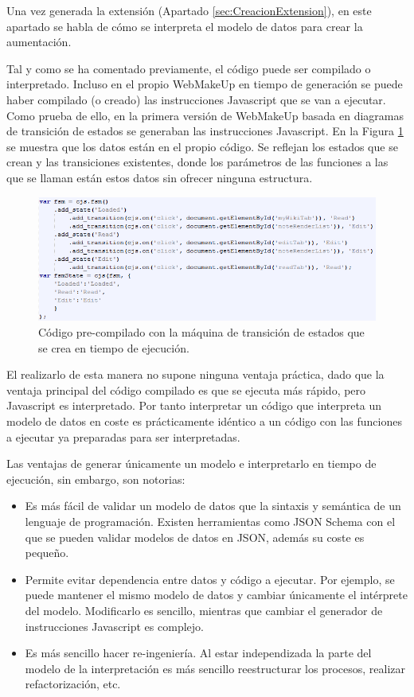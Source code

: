 Una vez generada la extensión (Apartado \ref{sec:CreacionExtension}), en este apartado se habla de cómo se interpreta el modelo de datos para crear la aumentación.

Tal y como se ha comentado previamente, el código puede ser compilado o interpretado. Incluso en el propio WebMakeUp en tiempo de generación se puede haber compilado (o creado) las instrucciones Javascript que se van a ejecutar. Como prueba de ello, en la primera versión de WebMakeUp basada en diagramas de transición de estados se generaban las instrucciones Javascript. En la Figura \ref{fig:generatedCompiledCodeSTD} se muestra que los datos están en el propio código. Se reflejan los estados que se crean y las transiciones existentes, donde los parámetros de las funciones a las que se llaman están estos datos sin ofrecer ninguna estructura.

\begin{figure}
\centering
\includegraphics[width=0.95\linewidth]{./figs/5-generatedCompiledCodeSTD}
\caption{Código pre-compilado con la máquina de transición de estados que se crea en tiempo de ejecución.}
\label{fig:generatedCompiledCodeSTD}
\end{figure}

El realizarlo de esta manera no supone ninguna ventaja práctica, dado que la ventaja principal del código compilado es que se ejecuta más rápido, pero Javascript es interpretado. Por tanto interpretar un código que interpreta un modelo de datos en coste es prácticamente idéntico a un código con las funciones a ejecutar ya preparadas para ser interpretadas.

Las ventajas de generar únicamente un modelo e interpretarlo en tiempo de ejecución, sin embargo, son notorias:
\begin{itemize}
\item{Es más fácil de validar un modelo de datos que la sintaxis y semántica de un lenguaje de programación. Existen herramientas como JSON Schema con el que se pueden validar modelos de datos en JSON, además su coste es pequeño.}
\item{Permite evitar dependencia entre datos y código a ejecutar. Por ejemplo, se puede mantener el mismo modelo de datos y cambiar únicamente el intérprete del modelo. Modificarlo es sencillo, mientras que cambiar el generador de instrucciones Javascript es complejo.}
\item{Es más sencillo hacer re-ingeniería. Al estar independizada la parte del modelo de la interpretación es más sencillo reestructurar los procesos, realizar refactorización, etc.}
\end{itemize}

